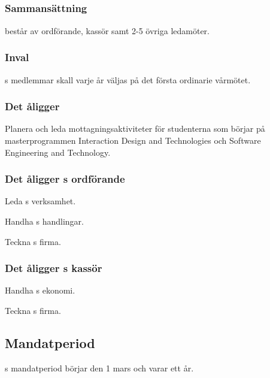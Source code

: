 \subsection{\MRCITFULL}
\subsubsection{Sammansättning}
\MRCIT{} består av ordförande, kassör samt 2-5 övriga ledamöter.

\subsubsection{Inval}
\MRCIT{}s medlemmar skall varje år väljas på det första ordinarie vårmötet.

\subsubsection{Det åligger \MRCIT}
\begin{att}
  \item Planera och leda mottagningsaktiviteter för studenterna som börjar på masterprogrammen Interaction Design and Technologies och Software Engineering and Technology.
\end{att}

\subsubsection{Det åligger \MRCIT{}s ordförande}
\begin{att}
  \item Leda \MRCIT{}s verksamhet.
  \item Handha \MRCIT{}s handlingar.
  \item Teckna \MRCIT{}s firma.
\end{att}

\subsubsection{Det åligger \MRCIT{}s kassör}
\begin{att}
  \item Handha \MRCIT{}s ekonomi.
  \item Teckna \MRCIT{}s firma.
\end{att}

\subsection{Mandatperiod}
\MRCIT{}s mandatperiod börjar den 1 mars och varar ett år.